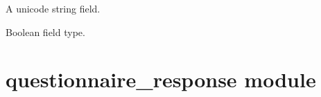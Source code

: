 \documentclass[letterpaper,10pt,english]{sphinxmanual}
\begin{document}
\begin{fulllineitems}
\begin{fulllineitems}
\end{fulllineitems}


\begin{fulllineitems}
\label{\detokenize{questionnaire_item:questionnaire_item.QuestionnaireItem.objects}}
\end{fulllineitems}


\begin{fulllineitems}
\label{\detokenize{questionnaire_item:questionnaire_item.QuestionnaireItem.positive_phrasing}}
A unicode string field.

\end{fulllineitems}


\begin{fulllineitems}
\label{\detokenize{questionnaire_item:questionnaire_item.QuestionnaireItem.usefullness}}
Boolean field type.


\end{fulllineitems}


\end{fulllineitems}



\chapter{questionnaire\_response module}
\label{\detokenize{questionnaire_response:module-questionnaire_response}}\label{\detokenize{questionnaire_response::doc}}\label{\detokenize{questionnaire_response:questionnaire-response-module}}
\end{document}
